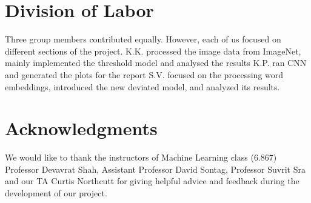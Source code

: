 \documentclass[11pt,letterpaper]{article}
\begin{document}
\section*{Division of Labor}
Three group members contributed equally. However, each of us focused on different sections of the project.
K.K. processed the image data from ImageNet, mainly implemented the threshold model and analysed the results
K.P. ran CNN and generated the plots for the report
S.V. focused on the processing word embeddings, introduced the new deviated model, and analyzed its results.

\section*{Acknowledgments}
We would like to thank the instructors of Machine Learning class (6.867) Professor Devavrat Shah, Assistant Professor David Sontag, Professor Suvrit Sra and our TA Curtis Northcutt for giving helpful advice and feedback during the development of our project.



% 
% 

% 
\end{document}
